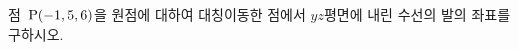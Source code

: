 점~$\mathrm{P}(-1{,}\mkern3mu\mathopen{}5{,}\mkern3mu\mathopen{}6)$을 원점에 대하여 대칭이동한 점에서 $yz$평면에 내린 수선의 발의 좌표를 구하시오.
